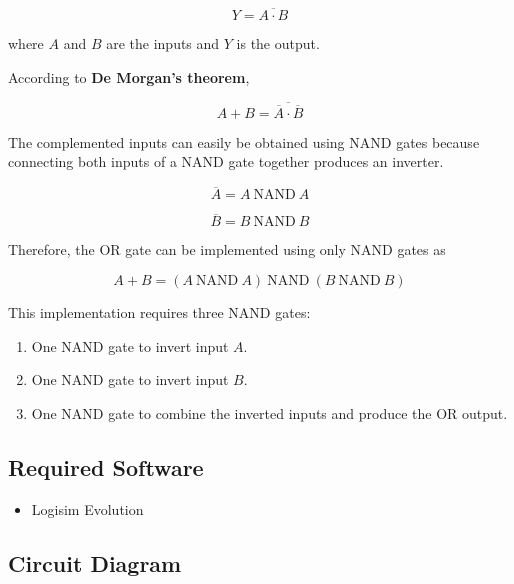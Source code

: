 \documentclass[12pt,a4paper]{article}
\begin{document}
\begin{equation}
Y=\overline{A\cdot B}
\end{equation}

where $A$ and $B$ are the inputs and $Y$ is the output.

According to \textbf{De Morgan's theorem},

\begin{equation}
A+B=\overline{\overline{A}\cdot\overline{B}}
\end{equation}

The complemented inputs can easily be obtained using NAND gates because connecting both inputs of a NAND gate together produces an inverter.

\begin{equation}
\overline{A}=A \ \text{NAND}\ A
\end{equation}

\begin{equation}
\overline{B}=B \ \text{NAND}\ B
\end{equation}

Therefore, the OR gate can be implemented using only NAND gates as

\begin{equation}
A+B=(A\ \text{NAND}\ A)\ \text{NAND}\ (B\ \text{NAND}\ B)
\end{equation}

This implementation requires three NAND gates:
\begin{enumerate}
    \item One NAND gate to invert input $A$.
    \item One NAND gate to invert input $B$.
    \item One NAND gate to combine the inverted inputs and produce the OR output.
\end{enumerate}

\subsection{Required Software}

\begin{itemize}
    \item Logisim Evolution
\end{itemize}

\subsection{Circuit Diagram}
\end{document}
